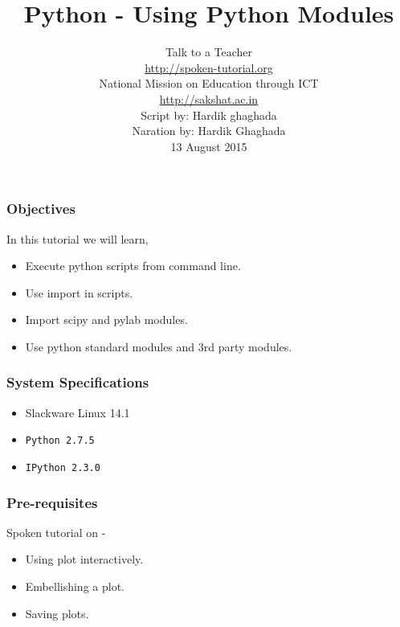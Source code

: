 \documentclass[17pt,compress]{beamer}
\author[FOSSEE]{}
\institute[IIT Bombay]{}
\date[]{}
\begin{document}
\sffamily \bfseries
\title
[Using Python Modules]
{Python - Using Python Modules}
\author
[FOSSEE, IIT - Bombay]
{\small Talk to a Teacher\\{\color{blue}\url{http://spoken-tutorial.org}}\\National Mission on Education
 through ICT\\{\color{blue}\url{http://sakshat.ac.in}} \\[0.5cm]{\tiny Script by: Hardik ghaghada \\ Naration by: Hardik Ghaghada \\ 13 August 2015}}

\begin{frame}
   \titlepage
\end{frame}
\begin{frame}
\frametitle{Objectives}
\label{sec-2}

  In this tutorial we will learn, \pause

\begin{itemize}
\item Execute python scripts from command line.\pause
\item Use import in scripts.\pause
\item Import scipy and pylab modules.\pause
\item Use python standard modules and 3rd party modules.
\end{itemize}
\end{frame}
\begin{frame}
\frametitle{System Specifications}\pause
\begin{itemize}
\item Slackware Linux 14.1\pause
\item \texttt{Python 2.7.5} \pause
\item \texttt{IPython 2.3.0}
\end{itemize}
\end{frame}
\begin{frame}
\frametitle{Pre-requisites}
\label{sec-3}

Spoken tutorial on -

\begin{itemize}
\item Using plot interactively.\pause
\item Embellishing a plot.\pause
\item Saving plots.
\end{itemize}
\end{frame}
\end{document}
